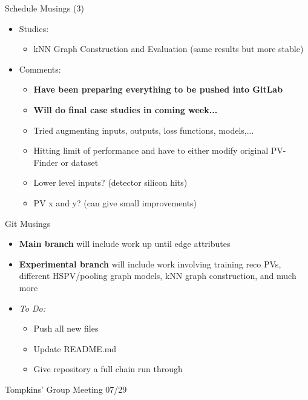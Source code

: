 \documentclass[xcolor=table,aspectratio=169]{beamer}
\begin{document}
\begin{frame}{Schedule Musings (3)}
    \begin{itemize}
        \item Studies:
        \begin{itemize}
            \item kNN Graph Construction and Evaluation (same results but more stable)
        \end{itemize}
        \item Comments:
        \begin{itemize}
            \item \textbf{Have been preparing everything to be pushed into GitLab}
            \item \textbf{Will do final case studies in coming week...}
            \item Tried augmenting inputs, outputs, loss functions, models,...
            \item Hitting limit of performance and have to either modify original PV-Finder or dataset
            \item Lower level inputs? (detector silicon hits)
            \item PV x and y? (can give small improvements)
        \end{itemize}
    \end{itemize}
\end{frame}

\begin{frame}{Git Musings}
    \begin{itemize}
        \item \textbf{Main branch} will include work up until edge attributes
        \item \textbf{Experimental branch} will include work involving training reco PVs, different HSPV/pooling graph models, kNN graph construction, and much more
        \item \textit{To Do:}
        \begin{itemize}
            \item Push all new files
            \item Update README.md
            \item Give repository a full chain run through
        \end{itemize}
    \end{itemize}
\end{frame}

\begin{frame}[plain]
    \centering
    Tompkins' Group Meeting 07/29
\end{frame}
\end{document}
